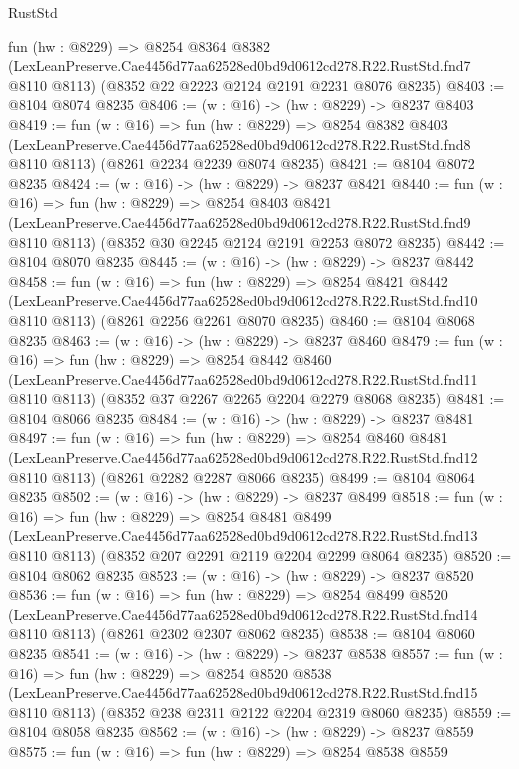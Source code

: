 \begin{lexlean}{RustStd}
\begin{coremodule}
  fun (hw : @8229) =>
  @8254
    @8364
    @8382
    (LexLeanPreserve.Cae4456d77aa62528ed0bd9d0612cd278.R22.RustStd.fnd7 @8110 @8113)
    (@8352 @22 @2223 @2124 @2191 @2231 @8076 @8235)
@8403 := @8104 @8074 @8235
@8406 := (w : @16) -> (hw : @8229) -> @8237 @8403
@8419 := fun (w : @16) =>
  fun (hw : @8229) =>
  @8254
    @8382
    @8403
    (LexLeanPreserve.Cae4456d77aa62528ed0bd9d0612cd278.R22.RustStd.fnd8 @8110 @8113)
    (@8261 @2234 @2239 @8074 @8235)
@8421 := @8104 @8072 @8235
@8424 := (w : @16) -> (hw : @8229) -> @8237 @8421
@8440 := fun (w : @16) =>
  fun (hw : @8229) =>
  @8254
    @8403
    @8421
    (LexLeanPreserve.Cae4456d77aa62528ed0bd9d0612cd278.R22.RustStd.fnd9 @8110 @8113)
    (@8352 @30 @2245 @2124 @2191 @2253 @8072 @8235)
@8442 := @8104 @8070 @8235
@8445 := (w : @16) -> (hw : @8229) -> @8237 @8442
@8458 := fun (w : @16) =>
  fun (hw : @8229) =>
  @8254
    @8421
    @8442
    (LexLeanPreserve.Cae4456d77aa62528ed0bd9d0612cd278.R22.RustStd.fnd10 @8110 @8113)
    (@8261 @2256 @2261 @8070 @8235)
@8460 := @8104 @8068 @8235
@8463 := (w : @16) -> (hw : @8229) -> @8237 @8460
@8479 := fun (w : @16) =>
  fun (hw : @8229) =>
  @8254
    @8442
    @8460
    (LexLeanPreserve.Cae4456d77aa62528ed0bd9d0612cd278.R22.RustStd.fnd11 @8110 @8113)
    (@8352 @37 @2267 @2265 @2204 @2279 @8068 @8235)
@8481 := @8104 @8066 @8235
@8484 := (w : @16) -> (hw : @8229) -> @8237 @8481
@8497 := fun (w : @16) =>
  fun (hw : @8229) =>
  @8254
    @8460
    @8481
    (LexLeanPreserve.Cae4456d77aa62528ed0bd9d0612cd278.R22.RustStd.fnd12 @8110 @8113)
    (@8261 @2282 @2287 @8066 @8235)
@8499 := @8104 @8064 @8235
@8502 := (w : @16) -> (hw : @8229) -> @8237 @8499
@8518 := fun (w : @16) =>
  fun (hw : @8229) =>
  @8254
    @8481
    @8499
    (LexLeanPreserve.Cae4456d77aa62528ed0bd9d0612cd278.R22.RustStd.fnd13 @8110 @8113)
    (@8352 @207 @2291 @2119 @2204 @2299 @8064 @8235)
@8520 := @8104 @8062 @8235
@8523 := (w : @16) -> (hw : @8229) -> @8237 @8520
@8536 := fun (w : @16) =>
  fun (hw : @8229) =>
  @8254
    @8499
    @8520
    (LexLeanPreserve.Cae4456d77aa62528ed0bd9d0612cd278.R22.RustStd.fnd14 @8110 @8113)
    (@8261 @2302 @2307 @8062 @8235)
@8538 := @8104 @8060 @8235
@8541 := (w : @16) -> (hw : @8229) -> @8237 @8538
@8557 := fun (w : @16) =>
  fun (hw : @8229) =>
  @8254
    @8520
    @8538
    (LexLeanPreserve.Cae4456d77aa62528ed0bd9d0612cd278.R22.RustStd.fnd15 @8110 @8113)
    (@8352 @238 @2311 @2122 @2204 @2319 @8060 @8235)
@8559 := @8104 @8058 @8235
@8562 := (w : @16) -> (hw : @8229) -> @8237 @8559
@8575 := fun (w : @16) =>
  fun (hw : @8229) =>
  @8254
    @8538
    @8559

\end{coremodule}
\end{lexlean}
